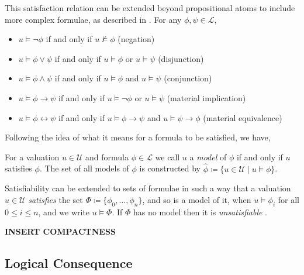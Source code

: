 This satisfaction relation can be extended beyond propositional atoms to include more complex formulae, as described in .
For any $\phi, \psi \in \mathcal{L}$, 
\begin{itemize}
	\item $u \vDash \neg \phi$ if and only if $u \nvDash \phi$ \hfill (negation)

	\item $u \vDash \phi \vee \psi$ if and only if $u \vDash \phi$ or $u \vDash \psi$ \hfill (disjunction)

	\item $u \vDash \phi \wedge \psi$ if and only if $u \vDash \phi$ and $u \vDash \psi$ \hfill (conjunction)

	\item $u \vDash \phi \rightarrow \psi$ if and only if $u \vDash \neg \phi$ or $u \vDash \psi$ \hfill (material
		implication)

	\item $u \vDash \phi \leftrightarrow \psi$ if and only if $u \vDash \phi \rightarrow \psi$ and $u \vDash \psi \rightarrow
		\phi$ \hfill (material equivalence)
\end{itemize}

Following the idea of what it means for a formula to be satisfied, we have,

\begin{definition}
	\label{definition:model}  For a valuation $u \in \mathcal{U}$ and formula $\phi \in \mathcal{L}$ we call $u$
	a \textit{model} of $\phi$ if and only if $u$ satisfies $\phi$. The set of all models of $\phi$ is constructed by $\hat
	{\phi}\coloneqq \{u \in \mathcal{U}\mid u \vDash \phi \}$.
\end{definition}

Satisfiability can be extended to sets of formulae in such a way that a valuation $u \in \mathcal{U}$ \textit{satisfies}
the set $\Phi \coloneqq \{\phi_{0}, \ldots , \phi_{n}\}$, and so is a model of it, when $u \vDash \phi_{i}$ for all $0 \leq
i \leq n$, and we write $u \vDash \Phi$. If $\Phi$ has no model then it is \textit{unsatisfiable}
\cite{Ben1993Mathematical}.

\begin{definition}
	\label{definition:compactness} \textbf{INSERT COMPACTNESS}
\end{definition}

\subsection{Logical Consequence}
\label{subsection:logical-consequence} 

